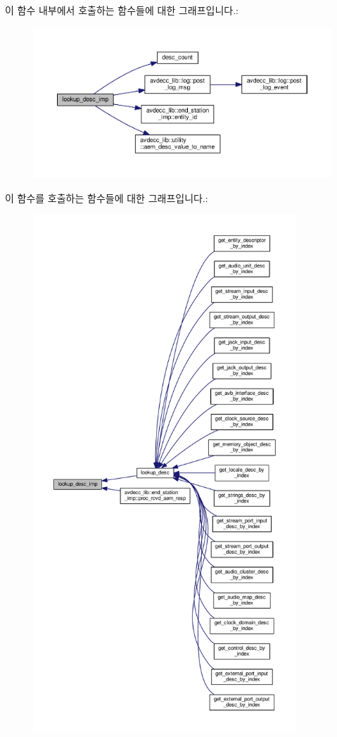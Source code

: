 이 함수 내부에서 호출하는 함수들에 대한 그래프입니다.\+:
\nopagebreak
\begin{figure}[H]
\begin{center}
\leavevmode
\includegraphics[width=350pt]{classavdecc__lib_1_1configuration__descriptor__imp_a143a190b7cebbb7ef3287569ec2d8c46_cgraph}
\end{center}
\end{figure}




이 함수를 호출하는 함수들에 대한 그래프입니다.\+:
\nopagebreak
\begin{figure}[H]
\begin{center}
\leavevmode
\includegraphics[height=550pt]{classavdecc__lib_1_1configuration__descriptor__imp_a143a190b7cebbb7ef3287569ec2d8c46_icgraph}
\end{center}
\end{figure}



